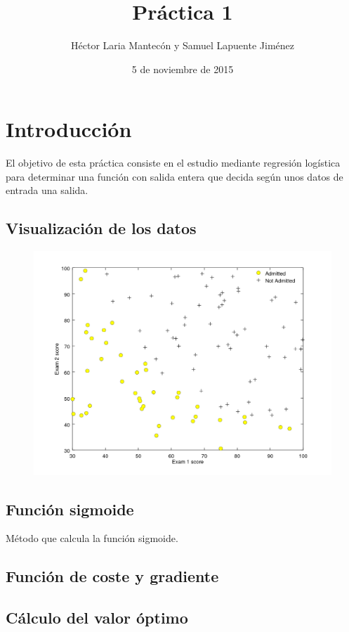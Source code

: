 \documentclass{article}
\title{Práctica 1}
\author{Héctor Laria Mantecón y Samuel Lapuente Jiménez}
\date{5 de noviembre de 2015}
\begin{document}
\maketitle

\section{Introducción}
El objetivo de esta práctica consiste en el estudio mediante regresión logística para determinar una función con salida entera que decida según unos datos de entrada una salida.

\subsection{Visualización de los datos}
\begin{figure}[h]
\centering
\includegraphics[width=\textwidth]{examples1}
\label{fig:estudio}
\end{figure}

\subsection{Función sigmoide}
Método que calcula la función sigmoide.


\subsection{Función de coste y gradiente}


\subsection{Cálculo del valor óptimo}

\end{document}
